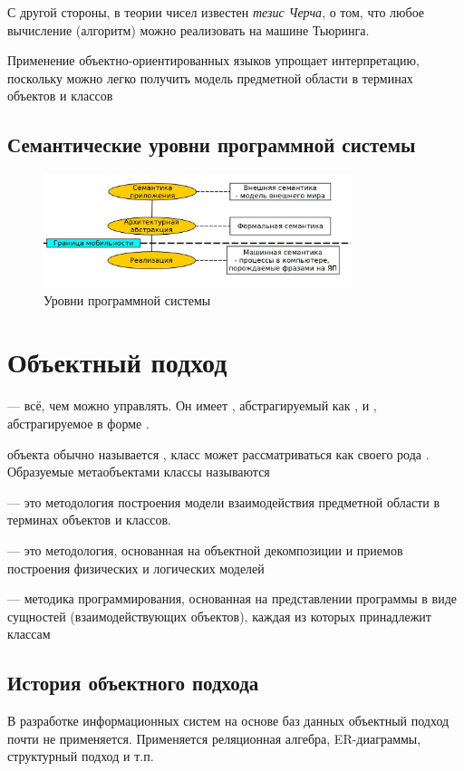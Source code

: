\documentclass[a4paper, 14pt]{extarticle}
\begin{document}
С другой стороны, в теории чисел известен \textit{тезис Черча}, о том, что любое вычисление (алгоритм) можно реализовать на машине Тьюринга.

Применение объектно-ориентированных языков упрощает интерпретацию, поскольку можно легко получить модель предметной области в терминах объектов и классов

\subsection{Семантические уровни программной системы}
\begin{figure}[h]
    \centering
    \includegraphics[width=0.8\textwidth]{./img/L1/S002.jpg}
    \caption{Уровни программной системы}%
    \label{img:l1:2}
\end{figure}

\section{Объектный подход}
 --- всё, чем можно управлять. Он имеет , абстрагируемый как , и , абстрагируемое в форме . 

 объекта обычно называется , класс может рассматриваться как своего рода . Образуемые метаобъектами классы называются 

 --- это методология построения модели взаимодействия предметной области в терминах объектов и классов.

 --- это методология, основанная на объектной декомпозиции и приемов построения физических и логических моделей

 --- методика программирования, основанная на представлении программы в виде сущностей (взаимодействующих объектов), каждая из которых принадлежит классам

\subsection{История объектного подхода}
В разработке информационных систем на основе баз данных объектный подход почти не применяется. Применяется реляционная алгебра, ER-диаграммы, структурный подход и т.п. 
\end{document}
